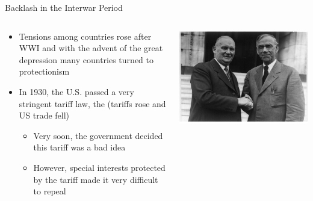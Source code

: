 \documentclass[10pt,hyperref={CJKbookmarks=true},xcolor=dvipsnames,aspectratio=169]{beamer}
\begin{document}
\begin{frame}{Backlash in the Interwar Period}
\begin{columns}
	\begin{column}{0.6\textwidth}
		\begin{itemize}
			\item Tensions among countries rose after WWI and with
			the advent of the great depression many countries
			turned to protectionism
			\item In 1930, the U.S. passed a very stringent tariff law,
			the  (tariffs rose and US trade
			fell)
			\begin{itemize}
				\item Very soon, the government decided this
				tariff was a bad idea
				\item However, special interests protected by the
				tariff made it very difficult to repeal
			\end{itemize}
		\end{itemize}
	\end{column}
	\begin{column}{0.4\textwidth}
		\includegraphics[scale=0.28]{fig/politic/smoot}
	\end{column}
\end{columns}
	
\end{frame}
\end{document}
